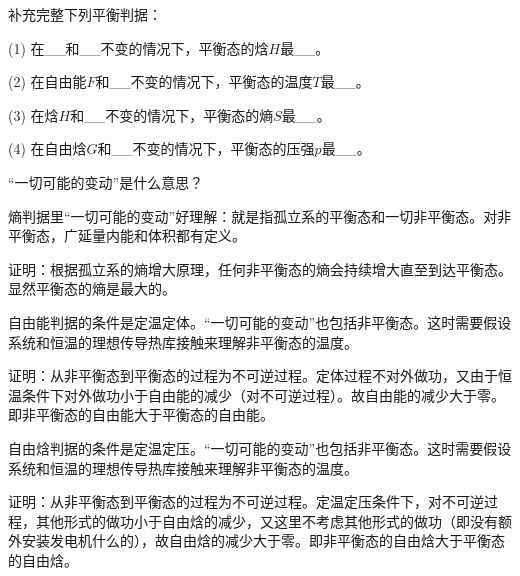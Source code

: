 \documentclass[CJK]{beamer}
\begin{document}
\begin{frame}
  \bch
  补充完整下列平衡判据：
  \bitem
\item[(1)]{在\_\_和\_\_不变的情况下，平衡态的焓$H$最\_\_。}
\item[(2)]{在自由能$F$和\_\_不变的情况下，平衡态的温度$T$最\_\_。}
\item[(3)]{在焓$H$和\_\_不变的情况下，平衡态的熵$S$最\_\_。}
\item[(4)]{在自由焓$G$和\_\_不变的情况下，平衡态的压强$p$最\_\_。}
  \eitem
  \ech
\end{frame}

\begin{frame}
\bch
“一切可能的变动”是什么意思？

\ech
\end{frame}

\begin{frame}
\bch
熵判据里“一切可能的变动”好理解：就是指孤立系的平衡态和一切非平衡态。对非平衡态，广延量内能和体积都有定义。



证明：根据孤立系的熵增大原理，任何非平衡态的熵会持续增大直至到达平衡态。显然平衡态的熵是最大的。

\ech
\end{frame}


\begin{frame}
\bch
自由能判据的条件是定温定体。“一切可能的变动”也包括非平衡态。这时需要假设系统和恒温的理想传导热库接触来理解非平衡态的温度。


证明：从非平衡态到平衡态的过程为不可逆过程。定体过程不对外做功，又由于恒温条件下对外做功小于自由能的减少（对不可逆过程）。故自由能的减少大于零。即非平衡态的自由能大于平衡态的自由能。

\ech
\end{frame}

\begin{frame}
\bch
自由焓判据的条件是定温定压。“一切可能的变动”也包括非平衡态。这时需要假设系统和恒温的理想传导热库接触来理解非平衡态的温度。


证明：从非平衡态到平衡态的过程为不可逆过程。定温定压条件下，对不可逆过程，其他形式的做功小于自由焓的减少，又这里不考虑其他形式的做功（即没有额外安装发电机什么的），故自由焓的减少大于零。即非平衡态的自由焓大于平衡态的自由焓。

\ech
\end{frame}
\end{document}
